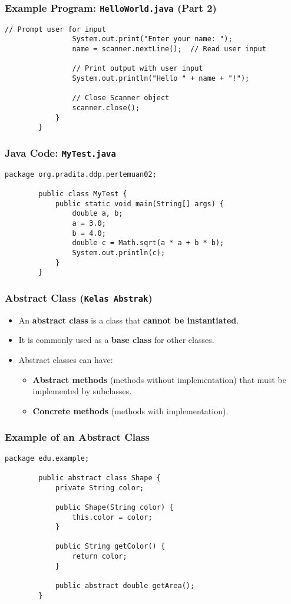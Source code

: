 \documentclass[aspectratio=169, table]{beamer}
\begin{document}
		\begin{frame}[fragile]
			\frametitle{Example Program: \texttt{HelloWorld.java} (Part 2)}
			
			\begin{lstlisting}[style=JavaStyle, caption={Example Program: HelloWorld.java (Part 2)}]
				// Prompt user for input
				System.out.print("Enter your name: ");
				name = scanner.nextLine();  // Read user input
				
				// Print output with user input
				System.out.println("Hello " + name + "!");
				
				// Close Scanner object
				scanner.close();
			}
		}
	\end{lstlisting}
\end{frame}


\begin{frame}[fragile]
	\frametitle{Java Code: \texttt{MyTest.java}}
	\begin{lstlisting}[style=JavaStyle, caption={Java Code: MyTest.java}]
		package org.pradita.ddp.pertemuan02;
		
		public class MyTest {
			public static void main(String[] args) {
				double a, b;
				a = 3.0;
				b = 4.0;
				double c = Math.sqrt(a * a + b * b);
				System.out.println(c);
			}
		}
	\end{lstlisting}
\end{frame}

\begin{frame}[fragile]
	\frametitle{Abstract Class (\texttt{Kelas Abstrak})}
	
	\begin{itemize}
		\item An \textbf{abstract class} is a class that \textbf{cannot be instantiated}.
		\item It is commonly used as a \textbf{base class} for other classes.
		\item Abstract classes can have:
		\begin{itemize}
			\item \textbf{Abstract methods} (methods without implementation) that must be implemented by subclasses.
			\item \textbf{Concrete methods} (methods with implementation).
		\end{itemize}
	\end{itemize}
\end{frame}

\begin{frame}[fragile]
	\frametitle{Example of an Abstract Class}
	
	\begin{lstlisting}[style=JavaStyle, caption={Example of an Abstract Class: \texttt{Shape.java}}]
		package edu.example;
		
		public abstract class Shape {
			private String color;
			
			public Shape(String color) {
				this.color = color;
			}
			
			public String getColor() {
				return color;
			}
			
			public abstract double getArea();
		}
	\end{lstlisting}
\end{frame}
\end{document}
